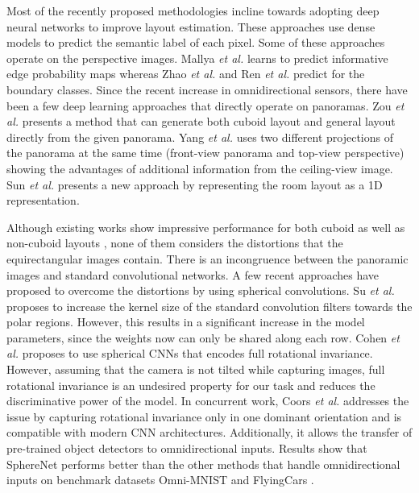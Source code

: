 \documentclass[final]{cvpr}
\begin{document}
Most of the recently proposed methodologies incline towards adopting deep neural networks to improve layout estimation. These approaches use dense models to predict the semantic label of each pixel. Some of these approaches \cite{mallya2015learning, ren2016coarse, zhao2017physics} operate on the perspective images. Mallya \textit{et al.} \cite{mallya2015learning} learns to predict informative edge probability maps whereas Zhao \textit{et al.} and Ren \textit{et al.} \cite{zhao2017physics, ren2016coarse} predict for the boundary classes. Since the recent increase in omnidirectional sensors, there have been a few deep learning approaches that directly operate on panoramas. Zou \textit{et al.} \cite{zou2018layoutnet} presents a method that can generate both cuboid layout and general layout directly from the given panorama. Yang \textit{et al.} \cite{yang2019dula} uses two different projections of the panorama at the same time (front-view panorama and top-view perspective) showing the advantages of additional information from the ceiling-view image. Sun \textit{et al.} \cite{sun2019horizonnet} presents a new approach by representing the room layout as a 1D representation.

Although existing works show impressive performance for both cuboid as well as non-cuboid layouts \cite{sun2019horizonnet, yang2019dula, zou2018layoutnet}, none of them considers the distortions that the equirectangular images contain. There is an incongruence between the panoramic images and standard convolutional networks. A few recent approaches have proposed to overcome the distortions by using spherical convolutions. Su \textit{et al.} \cite{su2017learning} proposes to increase the kernel size of the standard convolution filters towards the polar regions. However, this results in a significant increase in the model parameters, since the weights now can only be shared along each row. Cohen \textit{et al.} \cite{cohen2018spherical} proposes to use spherical CNNs that encodes full rotational invariance. However, assuming that the camera is not tilted while capturing  images, full rotational invariance is an undesired property for our task and reduces the discriminative power of the model. In concurrent work, Coors \textit{et al.} \cite{coors2018spherenet} addresses the issue by capturing rotational invariance only in one dominant orientation and is compatible with modern CNN architectures. Additionally, it allows the transfer of pre-trained object detectors to omnidirectional inputs. Results show that SphereNet \cite{coors2018spherenet} performs better than the other methods that handle omnidirectional inputs on benchmark datasets Omni-MNIST and FlyingCars \cite{coors2018spherenet}.
\end{document}
